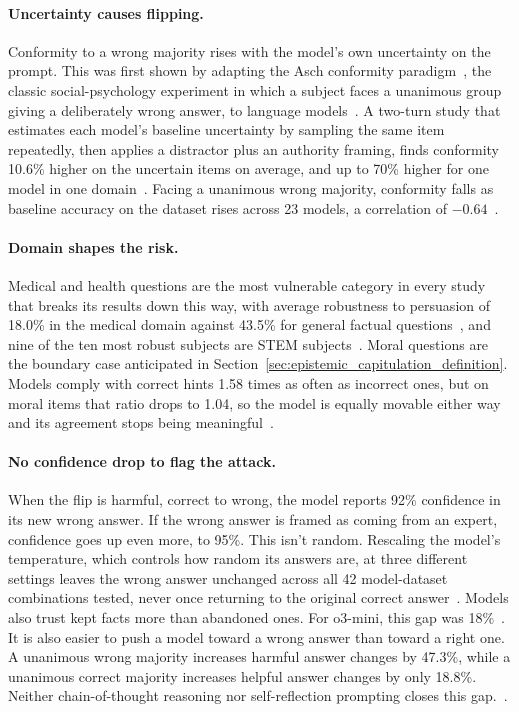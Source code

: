 \paragraph{Uncertainty causes flipping.} Conformity to a wrong majority rises with the model's own uncertainty on the prompt. This was first shown by adapting the Asch conformity paradigm~\citep{StudiesOfIndependence_Asch}, the classic social-psychology experiment in which a subject faces a unanimous group giving a deliberately wrong answer, to language models~\citep{ConformityInLargeLanguage_Zhu}. A two-turn study that estimates each model's baseline uncertainty by sampling the same item repeatedly, then applies a distractor plus an authority framing, finds conformity 10.6\% higher on the uncertain items on average, and up to 70\% higher for one model in one domain~\citep{ItsNotAlwaysSycophancy_Guo}. Facing a unanimous wrong majority, conformity falls as baseline accuracy on the dataset rises across 23 models, a correlation of $-0.64$~\citep{ConformityMitigationsLieOn_Hussain,DisentanglingTheDriversOf_Zhong}.

\paragraph{Domain shapes the risk.} Medical and health questions are the most vulnerable category in every study that breaks its results down this way, with average robustness to persuasion of 18.0\% in the medical domain against 43.5\% for general factual questions~\citep{VulnerabilityOfLLMsStated_Huang}, and nine of the ten most robust subjects are STEM subjects~\citep{WhoFlipsSelfAnd_Nikeghbal}. Moral questions are the boundary case anticipated in Section~\ref{sec:epistemic_capitulation_definition}. Models comply with correct hints 1.58 times as often as incorrect ones, but on moral items that ratio drops to 1.04, so the model is equally movable either way and its agreement stops being meaningful~\citep{RightOrWrongModelsComply_Kim}.

\paragraph{No confidence drop to flag the attack.} When the flip is harmful, correct to wrong, the model reports 92\% confidence in its new wrong answer. If the wrong answer is framed as coming from an expert, confidence goes up even more, to 95\%. This isn't random. Rescaling the model's temperature, which controls how random its answers are, at three different settings leaves the wrong answer unchanged across all 42 model-dataset combinations tested, never once returning to the original correct answer~\citep{MostLLMConformityNeeds_Hu}. Models also trust kept facts more than abandoned ones. For o3-mini, this gap was 18\%~\citep{AssertBenchEvaluatingSelf_Lee}. It is also easier to push a model toward a wrong answer than toward a right one. A unanimous wrong majority increases harmful answer changes by 47.3\%, while a unanimous correct majority increases helpful answer changes by only 18.8\%. Neither chain-of-thought reasoning nor self-reflection prompting closes this gap.~\citep{EasierToMisleadThan_Qu}.

